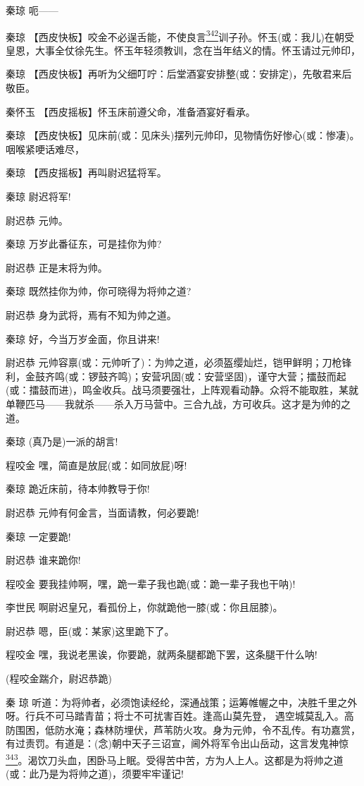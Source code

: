 秦琼 呃------

秦琼
【西皮快板】咬金不必逞舌能，不使良言\protect\hyperlink{fn342}{\textsuperscript{342}}训子孙。怀玉(或：我儿)在朝受皇恩，大事全仗徐先生。怀玉年轻须教训，念在当年结义的情。怀玉请过元帅印，

秦琼
【西皮快板】再听为父细叮咛：后堂酒宴安排整(或：安排定)，先敬君来后敬臣。

秦怀玉 【西皮摇板】怀玉床前遵父命，准备酒宴好看承。

秦琼
【西皮快板】见床前(或：见床头)摆列元帅印，见物情伤好惨心(或：惨凄)。咽喉紧哽话难尽，

秦琼 【西皮摇板】再叫尉迟猛将军。

秦琼 尉迟将军!

尉迟恭 元帅。

秦琼 万岁此番征东，可是挂你为帅?

尉迟恭 正是末将为帅。

秦琼 既然挂你为帅，你可晓得为将帅之道?

尉迟恭 身为武将，焉有不知为帅之道。

秦琼 好，今当万岁金面，你且讲来!

尉迟恭
元帅容禀(或：元帅听了)：为帅之道，必须盔缨灿烂，铠甲鲜明；刀枪锋利，金鼓齐鸣(或：锣鼓齐鸣)；安营巩固(或：安营坚固)，谨守大营；擂鼓而起(或：擂鼓而进)，鸣金收兵。战马须要强壮，上阵观看动静。众将不能取胜，某就单鞭匹马------我就杀------杀入万马营中。三合九战，方可收兵。这才是为帅的之道。

秦琼 (真乃是)一派的胡言!

程咬金 嘿，简直是放屁(或：如同放屁)呀!

秦琼 跪近床前，待本帅教导于你!

尉迟恭 元帅有何金言，当面请教，何必要跪!

秦琼 一定要跪!

尉迟恭 谁来跪你!

程咬金 要我挂帅啊，嘿，跪一辈子我也跪(或：跪一辈子我也干呐)!

李世民 啊尉迟皇兄，看孤份上，你就跪他一膝(或：你且屈膝)。

尉迟恭 嗯，臣(或：某家)这里跪下了。

程咬金 嘿，我说老黑诶，你要跪，就两条腿都跪下罢，这条腿干什么呐!

(程咬金踹介，尉迟恭跪)

秦 琼
听道：为将帅者，必须饱读经纶，深通战策；运筹帷幄之中，决胜千里之外呀。行兵不可马踏青苗；将士不可扰害百姓。逢高山莫先登，
遇空城莫乱入。高防围困，低防水淹；森林防埋伏，芦苇防火攻。身为元帅，令不乱传。有功嘉赏，有过责罚。有道是：(念)朝中天子三诏宣，阃外将军令出山岳动，这言发鬼神惊\protect\hyperlink{fn343}{\textsuperscript{343}}。渴饮刀头血，困卧马上眠。受得苦中苦，方为人上人。这都是为将帅之道(或：此乃是为将帅之道)，须要牢牢谨记!

